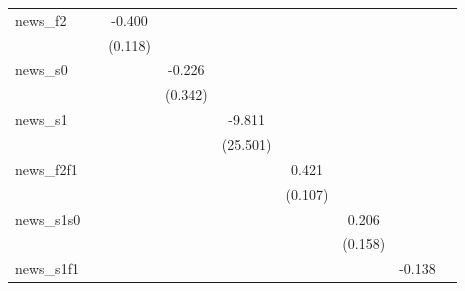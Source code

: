 {\begin{tabular}{l*{8}{c}}
\addlinespace
news\_f2     &                     &      -0.400\sym{***}&                     &                     &                     &                     &                     &                     \\
            &                     &     (0.118)         &                     &                     &                     &                     &                     &                     \\
\addlinespace
news\_s0     &                     &                     &      -0.226         &                     &                     &                     &                     &                     \\
            &                     &                     &     (0.342)         &                     &                     &                     &                     &                     \\
\addlinespace
news\_s1     &                     &                     &                     &      -9.811         &                     &                     &                     &                     \\
            &                     &                     &                     &    (25.501)         &                     &                     &                     &                     \\
\addlinespace
news\_f2f1   &                     &                     &                     &                     &       0.421\sym{***}&                     &                     &                     \\
            &                     &                     &                     &                     &     (0.107)         &                     &                     &                     \\
\addlinespace
news\_s1s0   &                     &                     &                     &                     &                     &       0.206         &                     &                     \\
            &                     &                     &                     &                     &                     &     (0.158)         &                     &                     \\
\addlinespace
news\_s1f1   &                     &                     &                     &                     &                     &                     &      -0.138         &                     \\

\end{tabular}}
